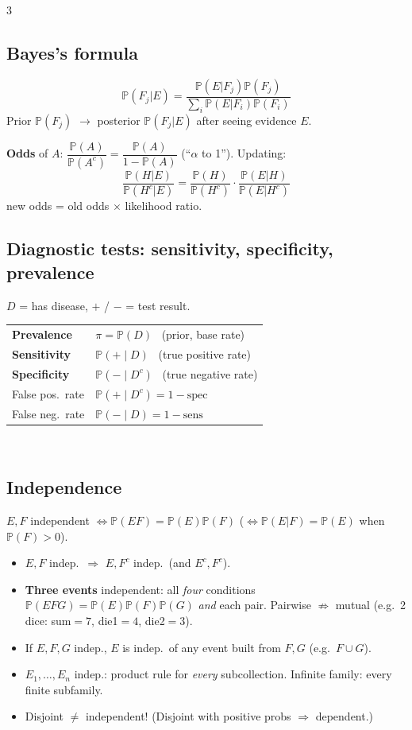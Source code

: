 \documentclass[8pt]{extarticle}
\newcommand{\PP}{\mathbb{P}}
\begin{document}
\begin{multicols*}{3}
\subsection{Bayes's formula}
\[\PP(F_j|E)=\frac{\PP(E|F_j)\PP(F_j)}{\sum_i\PP(E|F_i)\PP(F_i)}\]
Prior $\PP(F_j)$ $\to$ posterior $\PP(F_j|E)$ after seeing evidence $E$.

\textbf{Odds} of $A$: $\dfrac{\PP(A)}{\PP(A^c)}=\dfrac{\PP(A)}{1-\PP(A)}$ (``$\alpha$ to 1''). Updating:
\[\frac{\PP(H|E)}{\PP(H^c|E)}=\frac{\PP(H)}{\PP(H^c)}\cdot\frac{\PP(E|H)}{\PP(E|H^c)}\]
new odds = old odds $\times$ likelihood ratio.

\subsection{Diagnostic tests: sensitivity, specificity, prevalence}
$D$ = has disease, $+$ / $-$ = test result.\\
\begin{tabular}{@{}l@{\ }l@{}}
\textbf{Prevalence} & $\pi=\PP(D)$ \ (prior, base rate)\\
\textbf{Sensitivity} & $\PP(+\mid D)$ \ (true positive rate)\\
\textbf{Specificity} & $\PP(-\mid D^c)$ \ (true negative rate)\\
False pos.\ rate & $\PP(+\mid D^c)=1-\text{spec}$\\
False neg.\ rate & $\PP(-\mid D)=1-\text{sens}$
\end{tabular}\\[2pt]


\subsection{Independence}
$E,F$ independent $\iff\PP(EF)=\PP(E)\PP(F)$ ($\iff\PP(E|F)=\PP(E)$ when $\PP(F)>0$).
\begin{itemize}
\item $E,F$ indep.\ $\Rightarrow$ $E,F^c$ indep.\ (and $E^c,F^c$).
\item \textbf{Three events} independent: all \emph{four} conditions $\PP(EFG)=\PP(E)\PP(F)\PP(G)$ \emph{and} each pair. Pairwise $\not\Rightarrow$ mutual (e.g.\ 2 dice: sum$=7$, die1$=4$, die2$=3$).
\item If $E,F,G$ indep., $E$ is indep.\ of any event built from $F,G$ (e.g.\ $F\cup G$).
\item $E_1,\dots,E_n$ indep.: product rule for \emph{every} subcollection. Infinite family: every finite subfamily.
\item Disjoint $\ne$ independent! (Disjoint with positive probs $\Rightarrow$ dependent.)
\end{itemize}


\end{multicols*}
\end{document}
